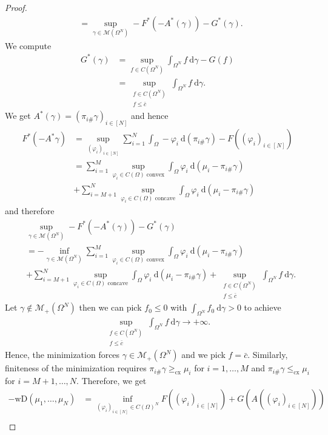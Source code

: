 \documentclass[letterpaper]{amsart}
\newcommand{\dd}{\mathrm{d}}
\theoremstyle{definition}
\begin{document}
\begin{proof}
\begin{align*}
		&=\sup_{\gamma\in\mathcal M(\Omega^N)}-F^*(-A^*(\gamma))-G^*(\gamma).
	\end{align*}
	We compute
	\begin{align*}
		G^*(\gamma)&=\sup_{f\in C(\Omega^N)}\int_{\Omega^N}f\ \dd\gamma-G(f)\\
		&=\sup_{\substack{f\in C(\Omega^N)\\ f\leq \bar c}}\int_{\Omega^N}f\ \dd\gamma.
	\end{align*}
	We get $A^*(\gamma)=(\pi_{i\#}\gamma)_{i\in[N]}$ and hence
	\begin{align*}
		F^*(-A^*\gamma)&=\sup_{(\varphi_i)_{i\in[N]}}\sum_{i=1}^N\int_\Omega-\varphi_i\ \dd(\pi_{i\#}\gamma)-F((\varphi_i)_{i\in[N]})\\
		&=\sum_{i=1}^M\sup_{\varphi_i\in C(\Omega)\text{ convex}}\int_\Omega\varphi_i\ \dd(\mu_i-\pi_{i\#}\gamma)\\
		&+\sum_{i=M+1}^N\sup_{\varphi_i\in C(\Omega)\text{ concave}}\int_\Omega\varphi_i\ \dd(\mu_i-\pi_{i\#}\gamma)
	\end{align*}
	and therefore
	\begin{align*}
		&\sup_{\gamma\in\mathcal M(\Omega^N)}-F^*(-A^*(\gamma))-G^*(\gamma)\\
		&=-\inf_{\gamma\in\mathcal M(\Omega^N)}\sum_{i=1}^M\sup_{\varphi_i\in C(\Omega)\text{ convex}}\int_\Omega\varphi_i\ \dd(\mu_i-\pi_{i\#}\gamma)\\
		&+\sum_{i=M+1}^N\sup_{\varphi_i\in C(\Omega)\text{ concave}}\int_\Omega\varphi_i\ \dd(\mu_i-\pi_{i\#}\gamma)+\sup_{\substack{f\in C(\Omega^N)\\ f\leq \bar c}}\int_{\Omega^N}f\ \dd\gamma.
	\end{align*}
	Let $\gamma\notin\mathcal M_+(\Omega^N)$ then we can pick $f_0\leq 0$ with $\int_{\Omega^N}f_0\ \dd\gamma> 0$ to achieve
	\begin{gather*}
		\sup\limits_{\substack{f\in C(\Omega^N)\\ f\leq \bar c}}\int_{\Omega^N}f\ \dd\gamma\rightarrow+\infty.
	\end{gather*}
	Hence, the minimization forces $\gamma\in\mathcal M_+(\Omega^N)$ and we pick $f=\bar c$. Similarly, finiteness of the minimization requires $\pi_{i\#}\gamma\geq_{\text{cx}}\mu_i$ for $i=1,\dots,M$ and $\pi_{i\#}\gamma\leq_{\text{cx}}\mu_i$ for $i=M+1,\dots,N$. Therefore, we get
	\begin{align*}
		-\text{wD}(\mu_1,\dots,\mu_N)&=\inf_{(\varphi_i)_{i\in[N]}\in C(\Omega)^N} F((\varphi_i)_{i\in[N]})+ G(A((\varphi_i)_{i\in[N]}))\\

\end{align*}
\end{proof}
\end{document}
